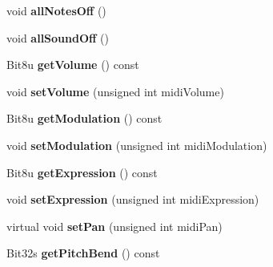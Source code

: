 \begin{DoxyCompactItemize}
\item 
\hypertarget{classMT32Emu_1_1Part_aedf53300721293483116b6347190bc76}{void {\bfseries all\-Notes\-Off} ()}\label{classMT32Emu_1_1Part_aedf53300721293483116b6347190bc76}

\item 
\hypertarget{classMT32Emu_1_1Part_acced18fc0702e94e40b87a875e40bd8a}{void {\bfseries all\-Sound\-Off} ()}\label{classMT32Emu_1_1Part_acced18fc0702e94e40b87a875e40bd8a}

\item 
\hypertarget{classMT32Emu_1_1Part_aa24b22f5a6cab001bdc42686c7e84569}{Bit8u {\bfseries get\-Volume} () const }\label{classMT32Emu_1_1Part_aa24b22f5a6cab001bdc42686c7e84569}

\item 
\hypertarget{classMT32Emu_1_1Part_a0c10c3ecc510b01a7d8891cfd4298c4a}{void {\bfseries set\-Volume} (unsigned int midi\-Volume)}\label{classMT32Emu_1_1Part_a0c10c3ecc510b01a7d8891cfd4298c4a}

\item 
\hypertarget{classMT32Emu_1_1Part_ac38e8436ad15f7e122d10f11d5a34cd8}{Bit8u {\bfseries get\-Modulation} () const }\label{classMT32Emu_1_1Part_ac38e8436ad15f7e122d10f11d5a34cd8}

\item 
\hypertarget{classMT32Emu_1_1Part_ae16d38381d86527835d97370e9e3ad66}{void {\bfseries set\-Modulation} (unsigned int midi\-Modulation)}\label{classMT32Emu_1_1Part_ae16d38381d86527835d97370e9e3ad66}

\item 
\hypertarget{classMT32Emu_1_1Part_a490686d7caa49f27eb5d57eca3f6c093}{Bit8u {\bfseries get\-Expression} () const }\label{classMT32Emu_1_1Part_a490686d7caa49f27eb5d57eca3f6c093}

\item 
\hypertarget{classMT32Emu_1_1Part_a54877659f1eed6a4f5edcbb861cdc270}{void {\bfseries set\-Expression} (unsigned int midi\-Expression)}\label{classMT32Emu_1_1Part_a54877659f1eed6a4f5edcbb861cdc270}

\item 
\hypertarget{classMT32Emu_1_1Part_ab78513b236541c168e0d6f545242c149}{virtual void {\bfseries set\-Pan} (unsigned int midi\-Pan)}\label{classMT32Emu_1_1Part_ab78513b236541c168e0d6f545242c149}

\item 
\hypertarget{classMT32Emu_1_1Part_abb22f1177392aa836d4b70922a10e128}{Bit32s {\bfseries get\-Pitch\-Bend} () const }\label{classMT32Emu_1_1Part_abb22f1177392aa836d4b70922a10e128}


\end{DoxyCompactItemize}
